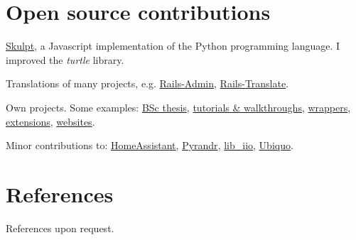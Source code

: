 \documentclass[a4paper]{report}
\newcommand{\listitemspace}{0.25em}
\renewenvironment{itemize}
{\begin{list}{}{\setlength{\leftmargin}{0em}
                \setlength{\parskip}{0em}
                \setlength{\itemsep}{\listitemspace}
                \setlength{\parsep}{\listitemspace}}}
{\end{list}}
\begin{document}
\vspace{-1em}
\section*{Open source contributions}
\begin{itemize}
    \item \href{https://github.com/royalmo/skulpt}{Skulpt}, a Javascript implementation of the Python programming language. I improved the \textit{turtle} library.
    \item Translations of many projects, e.g. \href{https://github.com/starchow/rails_admin-i18n}{Rails-Admin}, \href{https://github.com/bfcapell/translate}{Rails-Translate}.
    \item Own projects. Some examples: \href{https://gyroscreen.ericroy.net/}{BSc thesis}, \href{https://github.com/royalmo/docker-networks}{tutorials \& walkthroughs}, \href{https://github.com/royalmo/openvpn-manager}{wrappers}, \href{https://github.com/royalmo/itic-copilot}{extensions}, \href{https://umbages.cat}{websites}.
    \item Minor contributions to: \href{https://github.com/home-assistant/developers.home-assistant}{HomeAssistant}, \href{https://github.com/royalmo/pyrandr}{Pyrandr}, \href{https://github.com/analogdevicesinc/libiio/pull/1159}{lib\_iio}, \href{https://github.com/bfcapell/ubiquo/compare/master...royalmo:ubiquo:add_dynamically_ubiquo_assets_2024_11_28}{Ubiquo}.
\end{itemize}


\vspace{-1em}
\section*{References}

References upon request.

\end{document}
